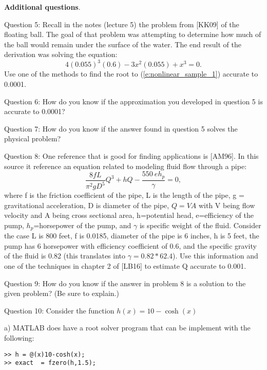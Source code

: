 \documentclass{article}
\renewcommand{\cite}[1]{[#1]}
\def\ds{\displaystyle}
\begin{document}
\medskip \par \noindent
%
{\bf Additional questions}. \medskip \par \noindent
Question 5: Recall in the notes (lecture 5) the problem from \cite{KK09} of the floating ball. The goal of that problem was attempting to determine how much of the ball would remain under the surface of the water. The end result of the derivation was solving the equation:
\begin{equation}
4(0.055)^3(0.6)-3x^2(0.055)+x^3=0.    
    \label{e:nonlinear_sample_1}
\end{equation}
Use one of the methods to find the root to (\ref{e:nonlinear_sample_1}) accurate to 0.0001. 
\medskip \par \noindent
Question 6: How do you know if the approximation you developed in question 5 is accurate to 0.0001?   
\medskip \par \noindent
Question 7: How do you know if the answer found in question 5 solves the physical problem?
\medskip \par \noindent
Question 8: One reference that is good for finding applications is \cite{AM96}. In this source it reference an equation related to modeling fluid flow through a pipe:
$$\frac {8fL}{\pi^2 g D^5}Q^3 + hQ - \frac {550 \ eh_p}{\gamma} =0,$$
where f is the friction coefficient of the pipe, L is the length of the pipe, g = gravitational acceleration, D is diameter of the pipe, $Q=VA$ with V being flow velocity and A being cross sectional area, h=potential head, e=efficiency of the pump, $h_p$=horsepower of the pump, and $\gamma$ is specific weight of the fluid. Consider the case L is 800 feet, f is 0.0185, diameter of the pipe is 6 inches, h is 5 feet, the pump has 6 horsepower with efficiency coefficient of 0.6, and the specific gravity of the fluid is 0.82 (this translates into $\gamma = 0.82*62.4$). Use this information and one of the techniques in chapter 2 of \cite{LB16} to estimate Q accurate to 0.001. 
\medskip \par \noindent
Question 9: How do you know if the answer in problem 8 is a solution to the given problem? (Be sure to explain.)

\par \bigskip \par

Question 10: Consider the function $\ds h(x)=10-\cosh(x)$

a) MATLAB does have a root solver program that can be implement with the following:
\begin{verbatim}
>> h = @(x)10-cosh(x);
>> exact  = fzero(h,1.5);
   \end{verbatim} 
   
\end{document}
